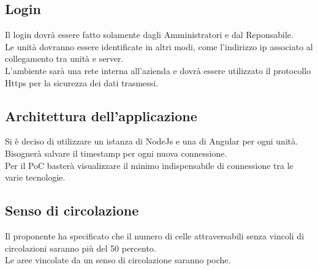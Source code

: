 \subsection{Login}
Il login dovrà essere fatto solamente dagli Amministratori e dal Reponsabile.\\
Le unità dovranno essere identificate in altri modi, come l'indirizzo ip associato al collegamento tra unità e server.\\
L'ambiente sarà una rete interna all'azienda e dovrà essere utilizzato il protocollo Https per la sicurezza dei dati trasmessi.

\subsection{Architettura dell'applicazione}
Si è deciso di utilizzare un istanza di NodeJs e una di Angular per ogni unità.\\
Bisognerà salvare il timestamp per ogni nuova connessione.\\
Per il PoC basterà visualizzare il minimo indispensabile di connessione tra le varie tecnologie.

\subsection{Senso di circolazione}
Il proponente ha specificato che il numero di celle attraversabili senza vincoli di circolazioni saranno più del 50 percento.\\
Le aree vincolate da un senso di circolazione saranno poche.


